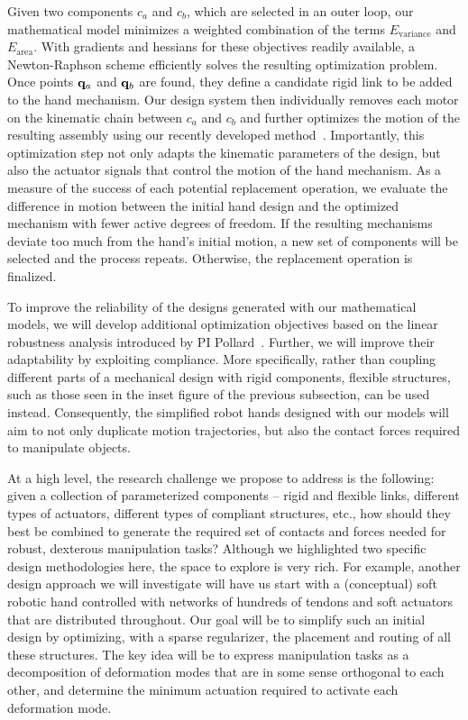 Given two components $c_a$ and $c_b$, which are selected in an outer loop, our mathematical model minimizes a weighted combination of the terms $E_\mathrm{variance}$ and $E_\mathrm{area}$. With gradients and hessians for these objectives readily available, a Newton-Raphson scheme efficiently solves the resulting optimization problem. Once points $\mathbf{q}_a$ and $\mathbf{q}_b$ are found, they define a candidate rigid link to be added to the hand mechanism. Our design system then individually removes each motor on the kinematic chain between $c_a$ and $c_b$ and further optimizes the motion of the resulting assembly using our recently developed method~\cite{Bacher2015}. Importantly, this optimization step not only adapts the kinematic parameters of the design, but also the actuator signals that control the motion of the hand mechanism. As a measure of the success of each potential replacement operation, we evaluate the difference in motion between the initial hand design and the optimized mechanism with fewer active degrees of freedom. If the resulting mechanisms deviate too much from the hand's initial motion, a new set of components will be selected and the process repeats. Otherwise, the replacement operation is finalized.

To improve the reliability of the designs generated with our mathematical models, we will develop additional optimization objectives based on the linear robustness analysis introduced by PI Pollard~\cite{Pollard:WAFR02,pollard2004closure,pollard20045}. Further, we will improve their adaptability by exploiting compliance. More specifically, rather than coupling different parts of a mechanical design with rigid components, flexible structures, such as those seen in the inset figure of the previous subsection, can be used instead. Consequently, the simplified robot hands designed with our models will aim to not only duplicate motion trajectories, but also the contact forces required to manipulate objects. 

At a high level, the research challenge we propose to address is the following: given a collection of parameterized components -- rigid and flexible links, different types of actuators, different types of compliant structures, etc., how should they best be combined to generate the required set of contacts and forces needed for robust, dexterous manipulation tasks? Although we highlighted two specific design methodologies here, the space to explore is very rich. For example, another design approach we will investigate will have us start with a (conceptual) soft robotic hand controlled with networks of hundreds of tendons and soft actuators that are distributed throughout. Our goal will be to simplify such an initial design by optimizing, with a sparse regularizer, the placement and routing of all these structures. The key idea will be to express manipulation tasks as a decomposition of deformation modes that are in some sense orthogonal to each other, and determine the minimum actuation required to activate each deformation mode.


